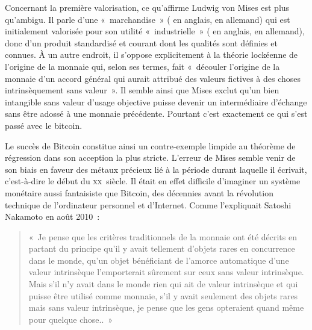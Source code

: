 Concernant la première valorisation, ce qu'affirme Ludwig von Mises est plus qu'ambigu. Il parle d'une «~marchandise~» ( en anglais,  en allemand) qui est initialement valorisée pour son utilité «~industrielle~» ( en anglais,  en allemand), donc d'un produit standardisé et courant dont les qualités sont définies et connues. À un autre endroit, il s'oppose explicitement à la théorie lockéenne de l'origine de la monnaie qui, selon ses termes, fait «~découler l'origine de la monnaie d'un accord général qui aurait attribué des valeurs fictives à des choses intrinsèquement sans valeur~». Il semble ainsi que Mises exclut qu'un bien intangible sans valeur d'usage objective puisse devenir un intermédiaire d'échange sans être adossé à une monnaie précédente. Pourtant c'est exactement ce qui s'est passé avec le bitcoin.

Le succès de Bitcoin constitue ainsi un contre-exemple limpide au théorème de régression dans son acception la plus stricte. L'erreur de Mises semble venir de son biais en faveur des métaux précieux lié à la période durant laquelle il écrivait, c'est-à-dire le début du \textsc{xx}\ieme{}~siècle. Il était en effet difficile d'imaginer un système monétaire aussi fantaisiste que Bitcoin, des décennies avant la révolution technique de l'ordinateur personnel et d'Internet. Comme l'expliquait Satoshi Nakamoto en août 2010~:

\begin{quote}
«~Je pense que les critères traditionnels de la monnaie ont été décrits en partant du principe qu'il y avait tellement d'objets rares en concurrence dans le monde, qu'un objet bénéficiant de l'amorce automatique d'une valeur intrinsèque l'emporterait sûrement sur ceux sans valeur intrinsèque. Mais s'il n'y avait dans le monde rien qui ait de valeur intrinsèque et qui puisse être utilisé comme monnaie, s'il y avait seulement des objets rares mais sans valeur intrinsèque, je pense que les gens opteraient quand même pour quelque chose..~»
\end{quote} 

